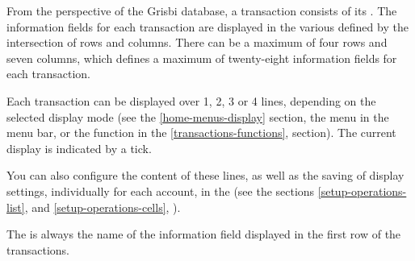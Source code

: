From the perspective of the Grisbi database, a transaction consists of its . The information fields for each transaction are displayed in the various  defined by the intersection of rows and columns. There can be a maximum of four rows and seven columns, which defines a maximum of twenty-eight information fields for each transaction.

Each transaction can be displayed over 1, 2, 3 or 4 lines, depending on the selected display mode (see the \vref{home-menus-display} section, the  menu in the menu bar, or the  function in the \vref{transactions-functions},  section). The current display is indicated by a tick.

You can also configure the content of these lines, as well as the saving of display settings, individually for each account, in the  (see the sections \vref{setup-operations-list},  and \vref{setup-operations-cells}, ).

The  is always the name of the information field displayed in the first row of the transactions.

